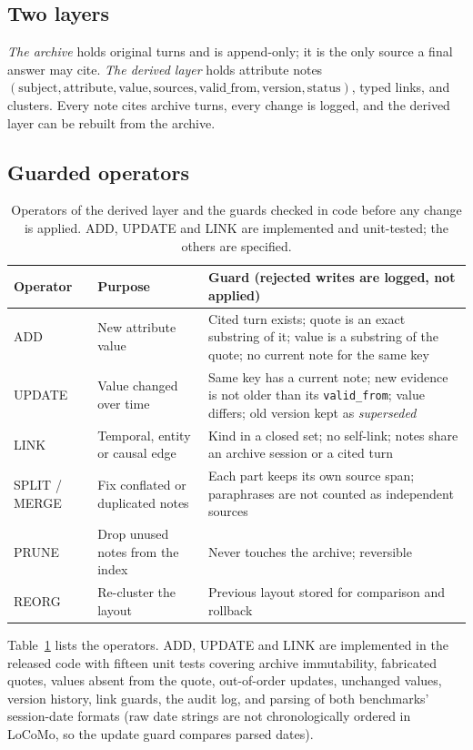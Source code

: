\documentclass[11pt]{article}
\begin{document}
\subsection{Two layers}

\emph{The archive} holds original turns and is append-only; it is the only
source a final answer may cite. \emph{The derived layer} holds attribute notes
$(\text{subject},\text{attribute},\text{value},\text{sources},\text{valid\_from},\text{version},\text{status})$,
typed links, and clusters. Every note cites archive turns, every change is
logged, and the derived layer can be rebuilt from the archive.

\subsection{Guarded operators}

\begin{table}[t]
\centering
\caption{Operators of the derived layer and the guards checked in code before
any change is applied. ADD, UPDATE and LINK are implemented and unit-tested;
the others are specified.}
\label{tab:ops}
\small
\begin{tabular}{p{1.6cm}p{5.2cm}p{6.6cm}}
\toprule
Operator & Purpose & Guard (rejected writes are logged, not applied) \\
\midrule
ADD & New attribute value & Cited turn exists; quote is an exact substring of it; value is a substring of the quote; no current note for the same key \\
UPDATE & Value changed over time & Same key has a current note; new evidence is not older than its \texttt{valid\_from}; value differs; old version kept as \emph{superseded} \\
LINK & Temporal, entity or causal edge & Kind in a closed set; no self-link; notes share an archive session or a cited turn \\
SPLIT / MERGE & Fix conflated or duplicated notes & Each part keeps its own source span; paraphrases are not counted as independent sources \\
PRUNE & Drop unused notes from the index & Never touches the archive; reversible \\
REORG & Re-cluster the layout & Previous layout stored for comparison and rollback \\
\bottomrule
\end{tabular}
\end{table}

Table~\ref{tab:ops} lists the operators. ADD, UPDATE and LINK are implemented
in the released code with fifteen unit tests covering archive immutability,
fabricated quotes, values absent from the quote, out-of-order updates,
unchanged values, version history, link guards, the audit log, and parsing of
both benchmarks' session-date formats (raw date strings are not chronologically
ordered in LoCoMo, so the update guard compares parsed dates).
\end{document}
